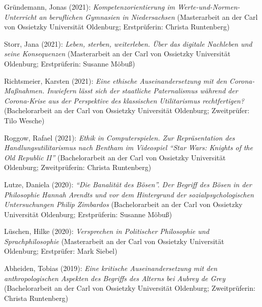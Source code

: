 \documentclass[a4paper,10pt]{article}
\newenvironment{literature}{%
   \parskip6pt\parindent0pt\raggedright
   \def\lititem{\hangindent=1cm\hangafter1}}{%
   \par\ignorespaces}
\begin{document}
\begin{literature}
\lititem Gründemann, Jonas (2021): \textit{Kompetenzorientierung im Werte-und-Normen-Unterricht an beruflichen Gymnasien in Niedersachsen} (Masterarbeit an der Carl von Ossietzky Universität Oldenburg; Erstprüferin: Christa Runtenberg)

\lititem Storr, Jana (2021): \textit{Leben, sterben, weiterleben. Über das digitale Nachleben und seine Konsequenzen} (Masterarbeit an der Carl von Ossietzky Universität Oldenburg; Erstprüferin: Susanne Möbuß)

\lititem Richtsmeier, Karsten (2021): \textit{Eine ethische Auseinandersetzung mit den Corona-Maßnahmen. Inwiefern lässt sich der staatliche Paternalismus während der Corona-Krise aus der Perspektive des klassischen Utilitarismus rechtfertigen?} (Bachelorarbeit an der Carl von Ossietzky Universität Oldenburg; Zweitprüfer: Tilo Wesche)

\lititem Roggow, Rafael (2021): \textit{Ethik in Computerspielen. Zur Repräsentation des Handlungsutilitarismus nach Bentham im Videospiel \enquote{Star Wars: Knights of the Old Republic II}} (Bachelorarbeit an der Carl von Ossietzky Universität Oldenburg; Zweitprüferin: Christa Runtenberg)

\lititem Lutze, Daniela (2020): \textit{\enquote{Die Banalität des Bösen}. Der Begriff des Bösen in der Philosophie Hannah Arendts und vor dem Hintergrund der sozialpsychologischen Untersuchungen Philip Zimbardos} (Bachelorarbeit an der Carl von Ossietzky Universität Oldenburg; Erstprüferin: Susanne Möbuß)

\lititem Lüschen, Hilke (2020): \textit{Versprechen in Politischer Philosophie und Sprachphilosophie} (Masterarbeit an der Carl von Ossietzky Universität Oldenburg; Erstprüfer: Mark Siebel)

\lititem Abheiden, Tobias (2019): \textit{Eine kritische Auseinandersetzung mit den anthropologischen Aspekten des Begriffs des Alterns bei Aubrey de Grey} (Bachelorarbeit an der Carl von Ossietzky Universität Oldenburg; Zweitprüferin: Christa Runtenberg)
\end{literature}


\clearpage
\end{document}
